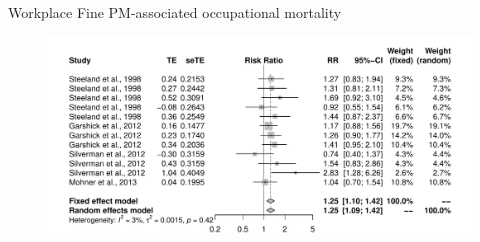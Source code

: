 \documentclass[final,t]{beamer}
\begin{document}
\begin{frame}[fragile]
\begin{columns}[t]
\begin{column}{0.36\linewidth}
\begin{block}{Workplace Fine PM-associated occupational mortality}
      \begin{figure}[htb]
      \includegraphics[width=.95\columnwidth]{fig3}
      \end{figure}
      \end{block}   
    \end{column}%


\end{columns}
\end{frame}
\end{document}

